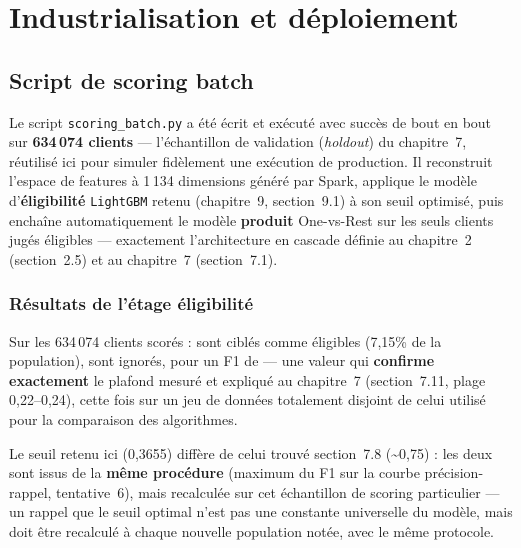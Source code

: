 \documentclass[11pt,a4paper]{report}
\begin{document}
\chapter{Industrialisation et déploiement}

\section{Script de scoring batch}
\statutFait{}
Le script \texttt{scoring\_batch.py} a été écrit et exécuté avec succès
de bout en bout sur \textbf{634\,074 clients} — l'échantillon de
validation (\textit{holdout}) du chapitre~7, réutilisé ici pour simuler
fidèlement une exécution de production. Il reconstruit l'espace de
features à 1\,134 dimensions généré par Spark, applique le modèle
d'\textbf{éligibilité} \texttt{LightGBM} retenu (chapitre~9,
section~9.1) à son seuil optimisé, puis enchaîne automatiquement le
modèle \textbf{produit} One-vs-Rest sur les seuls clients jugés
éligibles — exactement l'architecture en cascade définie au chapitre~2
(section~2.5) et au chapitre~7 (section~7.1).


\subsection{Résultats de l'étage éligibilité}
Sur les 634\,074 clients scorés :  sont ciblés
comme éligibles (7,15\% de la population), 
sont ignorés, pour un F1 de  — une valeur qui
\textbf{confirme exactement} le plafond mesuré et expliqué au chapitre~7
(section~7.11, plage 0,22--0,24), cette fois sur un jeu de données
totalement disjoint de celui utilisé pour la comparaison des algorithmes.

Le seuil retenu ici (0,3655) diffère de celui trouvé section~7.8
(\textasciitilde 0,75) : les deux sont issus de la \textbf{même
procédure} (maximum du F1 sur la courbe précision-rappel, tentative~6),
mais recalculée sur cet échantillon de scoring particulier — un rappel
que le seuil optimal n'est pas une constante universelle du modèle, mais
doit être recalculé à chaque nouvelle population notée, avec le même
protocole.
\end{document}
